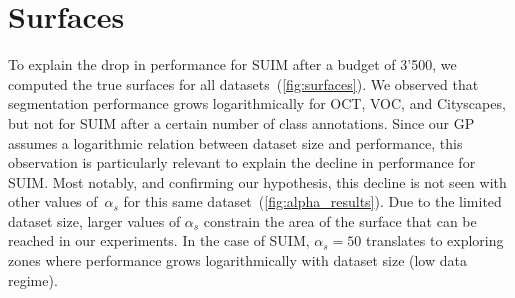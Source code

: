 \section{Surfaces}
\label{sec:surfaces}

To explain the drop in performance for SUIM after a budget of 3'500, we computed the true surfaces for all datasets~(\cref{fig:surfaces}). We observed that segmentation performance grows logarithmically for OCT, VOC, and Cityscapes, but not for SUIM after a certain number of class annotations. Since our GP assumes a logarithmic relation between dataset size and performance, this observation is particularly relevant to explain the decline in performance for SUIM. Most notably, and confirming our hypothesis, this decline is not seen with other values of~$\alpha_s$ for this same dataset~(\cref{fig:alpha_results}). Due to the limited dataset size, larger values of $\alpha_s$ constrain the area of the surface that can be reached in our experiments. In the case of SUIM, $\alpha_s = 50$ translates to exploring zones where performance grows logarithmically with dataset size (low data regime).


